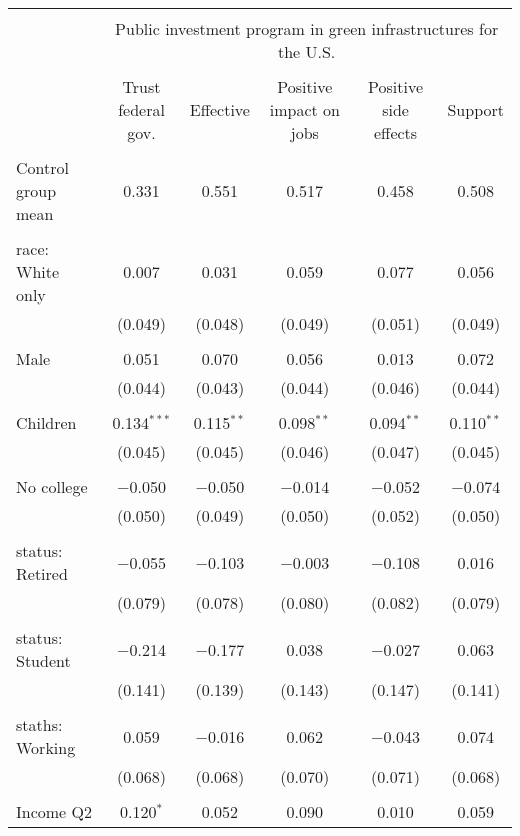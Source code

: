 
\begin{tabular}{@{\extracolsep{5pt}}lccccc} 
\\[-1.8ex]\hline 
\hline \\[-1.8ex] 
 & \multicolumn{5}{c}{Public investment program in green infrastructures for the U.S.} \\ 
\cline{2-6} 
\\[-1.8ex] & Trust federal gov. & Effective & Positive impact on jobs & Positive side effects & Support \\ 
\hline \\[-1.8ex] 
 Control group mean & 0.331 & 0.551 & 0.517 & 0.458 & 0.508  \\ \hline \\[-1.8ex] race: White only & 0.007 & 0.031 & 0.059 & 0.077 & 0.056 \\ 
  & (0.049) & (0.048) & (0.049) & (0.051) & (0.049) \\ 
  & & & & & \\ 
 Male & 0.051 & 0.070 & 0.056 & 0.013 & 0.072 \\ 
  & (0.044) & (0.043) & (0.044) & (0.046) & (0.044) \\ 
  & & & & & \\ 
 Children & 0.134$^{***}$ & 0.115$^{**}$ & 0.098$^{**}$ & 0.094$^{**}$ & 0.110$^{**}$ \\ 
  & (0.045) & (0.045) & (0.046) & (0.047) & (0.045) \\ 
  & & & & & \\ 
 No college & $-$0.050 & $-$0.050 & $-$0.014 & $-$0.052 & $-$0.074 \\ 
  & (0.050) & (0.049) & (0.050) & (0.052) & (0.050) \\ 
  & & & & & \\ 
 status: Retired & $-$0.055 & $-$0.103 & $-$0.003 & $-$0.108 & 0.016 \\ 
  & (0.079) & (0.078) & (0.080) & (0.082) & (0.079) \\ 
  & & & & & \\ 
 status: Student & $-$0.214 & $-$0.177 & 0.038 & $-$0.027 & 0.063 \\ 
  & (0.141) & (0.139) & (0.143) & (0.147) & (0.141) \\ 
  & & & & & \\ 
 staths: Working & 0.059 & $-$0.016 & 0.062 & $-$0.043 & 0.074 \\ 
  & (0.068) & (0.068) & (0.070) & (0.071) & (0.068) \\ 
  & & & & & \\ 
 Income Q2 & 0.120$^{*}$ & 0.052 & 0.090 & 0.010 & 0.059 \\ 

\end{tabular}
